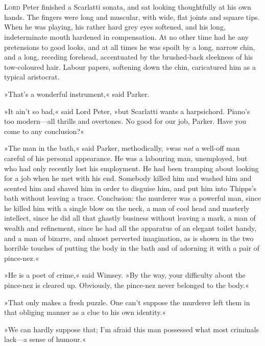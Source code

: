 \chapter[Chapter \thechapter]{}
\lettrine[lines=4]{L}{ord} Peter finished a Scarlatti sonata, and sat looking thoughtfully at his own hands. The fingers were long and muscular, with wide, flat joints and square tips. When he was playing, his rather hard grey eyes softened, and his long, indeterminate mouth hardened in compensation. At no other time had he any pretensions to good looks, and at all times he was spoilt by a long, narrow chin, and a long, receding forehead, accentuated by the brushed-back sleekness of his tow-coloured hair. Labour papers, softening down the chin, caricatured him as a typical aristocrat.

»That's a wonderful instrument,« said Parker.

»It ain't so bad,« said Lord Peter, »but Scarlatti wants a harpsichord. Piano's too modern\allowbreak---\allowbreak all thrills and overtones. No good for our job, Parker. Have you come to any conclusion?«

»The man in the bath,« said Parker, methodically, »was \textit{not} a well-off man careful of his personal appearance. He was a labouring man, unemployed, but who had only recently lost his employment. He had been tramping about looking for a job when he met with his end. Somebody killed him and washed him and scented him and shaved him in order to disguise him, and put him into Thipps's bath without leaving a trace. Conclusion: the murderer was a powerful man, since he killed him with a single blow on the neck, a man of cool head and masterly intellect, since he did all that ghastly business without leaving a mark, a man of wealth and refinement, since he had all the apparatus of an elegant toilet handy, and a man of bizarre, and almost perverted imagination, as is shown in the two horrible touches of putting the body in the bath and of adorning it with a pair of pince-nez.«

»He is a poet of crime,« said Wimsey. »By the way, your difficulty about the pince-nez is cleared up. Obviously, the pince-nez never belonged to the body.«

»That only makes a fresh puzzle. One can't suppose the murderer left them in that obliging manner as a clue to his own identity.«

»We can hardly suppose that; I'm afraid this man possessed what most criminals lack\allowbreak---\allowbreak a sense of humour.«

